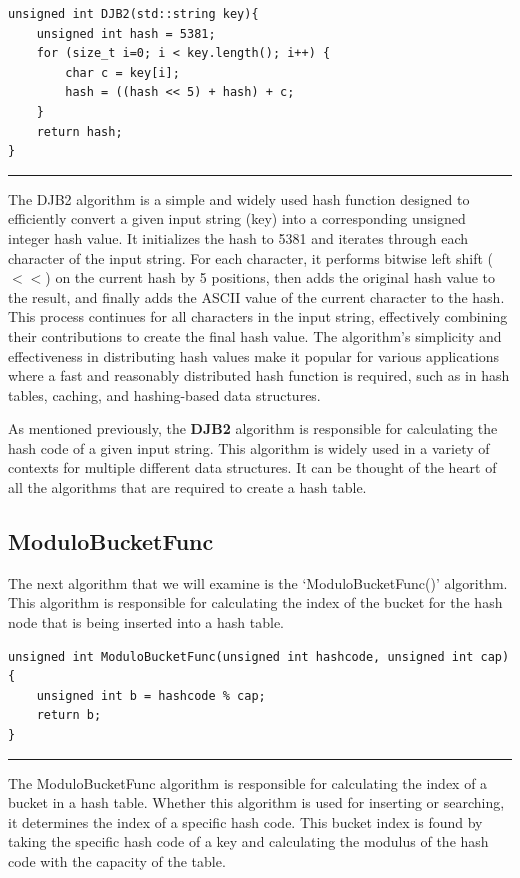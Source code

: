 \documentclass[a4paper,9pt]{article}
\newcommand{\horizontalline}{\noindent \rule{\textwidth}{0.5pt}\par}
\begin{document}
\begin{highlight}

\begin{verbatim}
unsigned int DJB2(std::string key){
    unsigned int hash = 5381;
    for (size_t i=0; i < key.length(); i++) {
        char c = key[i]; 
        hash = ((hash << 5) + hash) + c;
    }
    return hash;
}
\end{verbatim}

\horizontalline

The DJB2 algorithm is a simple and widely used hash function designed to efficiently convert a given input string (key) into a corresponding unsigned integer hash value. It initializes the hash to 5381 and 
iterates through each character of the input string. For each character, it performs bitwise left shift ($<<$) on the current hash by 5 positions, then adds the original hash value to the result, and finally 
adds the ASCII value of the current character to the hash. This process continues for all characters in the input string, effectively combining their contributions to create the final hash value. The algorithm's 
simplicity and effectiveness in distributing hash values make it popular for various applications where a fast and reasonably distributed hash function is required, such as in hash tables, caching, and 
hashing-based data structures.

\end{highlight}

\noindent As mentioned previously, the \textbf{DJB2} algorithm is responsible for calculating the hash code of a given input string. This algorithm is widely used in a variety of contexts for multiple different
data structures. It can be thought of the heart of all the algorithms that are required to create a hash table.

\subsection*{ModuloBucketFunc}

The next algorithm that we will examine is the `ModuloBucketFunc()' algorithm. This algorithm is responsible for calculating the index of the bucket for the hash node that is being inserted into a hash table. 

\begin{highlight}

\begin{verbatim}
unsigned int ModuloBucketFunc(unsigned int hashcode, unsigned int cap){
    unsigned int b = hashcode % cap;
    return b;
}
\end{verbatim}

\horizontalline

The ModuloBucketFunc algorithm is responsible for calculating the index of a bucket in a hash table. Whether this algorithm is used for inserting or searching, it determines the index of a specific hash code. 
This bucket index is found by taking the specific hash code of a key and calculating the modulus of the hash code with the capacity of the table.

\end{highlight}
\end{document}
